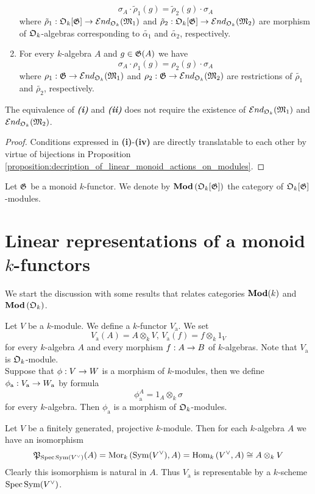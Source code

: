 \begin{proposition}
\begin{enumerate}[label=\emph{\textbf{(\roman*)}}, leftmargin=1.5em]
$$\sigma_A \cdot \tilde{\rho}_1(g) = \tilde{\rho}_2(g) \cdot \sigma_A$$
where $\tilde{\rho}_1:{\mathfrak O}_k[{\mathfrak G}] \rightarrow {\mathcal E} nd_{{\mathfrak O}_k}({\mathfrak M}_1)$ and $\tilde{\rho}_2:{\mathfrak O}_k[{\mathfrak G}] \rightarrow {\mathcal E} nd_{{\mathfrak O}_k}({\mathfrak M}_2)$ are morphism of ${\mathfrak O}_k$-algebras corresponding to $\tilde{\alpha_1}$ and $\tilde{\alpha_2}$, respectively.
\item For every $k$-algebra $A$ and $g\in {\mathfrak G}(A)$ we have
$$\sigma_A \cdot \rho_1(g) = \rho_2(g) \cdot \sigma_A$$
where $\rho_1:{\mathfrak G} \rightarrow {\mathcal E} nd_{{\mathfrak O}_k}({\mathfrak M}_1)$ and $\rho_2:{\mathfrak G} \rightarrow {\mathcal E} nd_{{\mathfrak O}_k}({\mathfrak M}_2)$ are restrictions of $\tilde{\rho_1}$ and $\tilde{\rho_2}$, respectively.
\end{enumerate}
The equivalence of \emph{\textbf{(i)}} and \emph{\textbf{(ii)}} does not require the existence of ${\mathcal E} nd_{{\mathfrak O}_k}({\mathfrak M}_1)$ and ${\mathcal E} nd_{{\mathfrak O}_k}({\mathfrak M}_2)$.
\end{proposition}
\begin{proof}
Conditions expressed in \textbf{(i)}-\textbf{(iv)} are directly translatable to each other by virtue of bijections in Proposition \ref{proposition:decription_of_linear_monoid_actions_on_modules}. 
\end{proof}
\noindent
Let ${\mathfrak G}$ be a monoid $k$-functor. We denote by $\mathbf{Mod}\left({\mathfrak O}_k[{\mathfrak G}]\right)$ the category of ${\mathfrak O}_k[{\mathfrak G}]$-modules.

\section{Linear representations of a monoid $k$-functors}
\noindent
We start the discussion with some results that relates categories $\mathbf{Mod}(k)$ and $\mathbf{Mod}\left({\mathfrak O}_k\right)$.

\begin{example}\label{example:additive_k_functor}
Let $V$ be a $k$-module. We define a $k$-functor $V_{\mathrm{a}}$. We set
$$V_{\mathrm{a}}(A) = A\otimes_kV,\,V_{\mathrm{a}}(f) = f\otimes_k1_V$$
for every $k$-algebra $A$ and every morphism $f:A\rightarrow B$ of $k$-algebras. Note that $V_{\mathrm{a}}$ is ${\mathfrak O}_k$-module.\\
Suppose that $\phi:V\rightarrow W$ is a morphism of $k$-modules, then we define $\phi_{\mathrm{a}}:V_{\mathrm{a}}\rightarrow W_{\mathrm{a}}$ by formula
$$\phi_{\mathrm{a}}^A = 1_A\otimes_k\sigma$$
for every $k$-algebra. Then $\phi_{\mathrm{a}}$ is a morphism of ${\mathfrak O}_k$-modules.
\end{example}

\begin{remark}\label{remark:representability_of_additive_functor}
Let $V$ be a finitely generated, projective $k$-module. Then for each $k$-algebra $A$ we have an isomorphism
$${\mathfrak P}_{\mathrm{Spec}\, \textrm{Sym}(V^{\vee})}(A) = \mathrm{Mor}_k\left(\textrm{Sym}(V^{\vee}), A\right) = \mathrm{Hom}_k\left(V^{\vee},A\right) \cong A\otimes_kV$$
Clearly this isomorphism is natural in $A$. Thus $V_{\mathrm{a}}$ is representable by a $k$-scheme $\mathrm{Spec}\, \textrm{Sym}(V^{\vee})$.
\end{remark}

